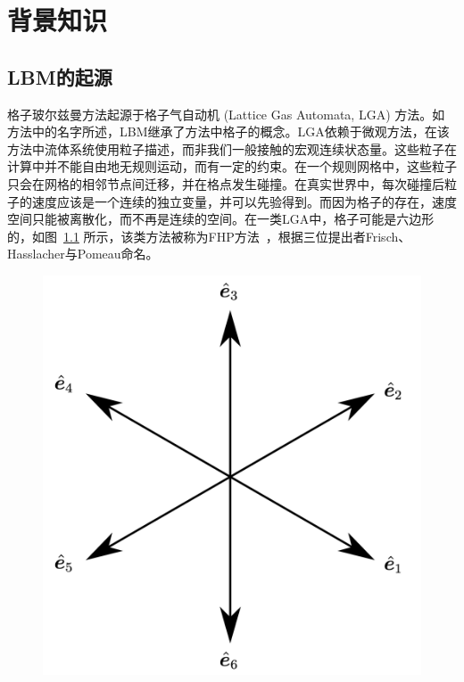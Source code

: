 \chapter{背景知识}
\label{chap:background}

\section{LBM的起源}
\label{sec:2_LBM_origin}
格子玻尔兹曼方法起源于格子气自动机 (Lattice Gas Automata, LGA) 方法。如方法中的名字所述，LBM继承了方法中格子的概念。LGA依赖于微观方法，在该方法中流体系统使用粒子描述，而非我们一般接触的宏观连续状态量。这些粒子在计算中并不能自由地无规则运动，而有一定的约束。在一个规则网格中，这些粒子只会在网格的相邻节点间迁移，并在格点发生碰撞。在真实世界中，每次碰撞后粒子的速度应该是一个连续的独立变量，并可以先验得到。而因为格子的存在，速度空间只能被离散化，而不再是连续的空间。在一类LGA中，格子可能是六边形的，如图~\ref{img:LGA_lattice} 所示，该类方法被称为FHP方法~\citep{frisch1986lattice}，根据三位提出者Frisch、Hasslacher与Pomeau命名。

\begin{figure}[htb]
    \centering
      \includegraphics[width=0.5\columnwidth]{figures/LGA_lattice.png}
    \label{img:LGA_lattice}
\end{figure}


